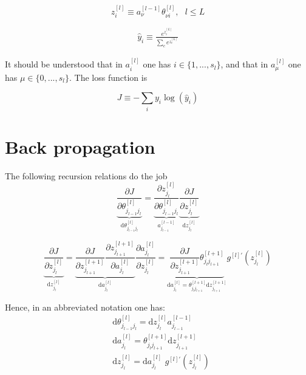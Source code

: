 \documentclass[a4paper,11pt]{article}
\newcommand{\dd}{\text{d}}
\newcommand{\na}[2]{a_{#1}^{[#2]}}
\newcommand{\nz}[2]{z_{#1}^{[#2]}}
\newcommand{\na}[3]{a_{#1 #2}^{[#2]}}
\newcommand{\nz}[3]{z_{#1 #2}^{[#2]}}
\newcommand{\nt}[3]{\theta_{#1 #2}^{[#3]}}
\newcommand{\nt}[4]{\theta_{#1 #2 #3}^{[#4]}}
\newcommand{\ff}[2]{#1 \left(#2 \right)}
\begin{document}
\begin{equation}
    \nz{i}{l}\equiv \na{\nu }{l-1} \nt{\nu}{i}{l} ,\,\,\,\, l\le L %
\end{equation}

\begin{align}
 \hat{y}_i \equiv   \frac{e^{\nz{i}{L}} } {\sum_c e^{\nz{c}{L} }}
\end{align}

It should be understood that in $\na{i}{l}$
one has  $i \in \{1,..., s_l\} $,
and that in $\na{\mu}{l}$ one has $ \mu \in \{0,..., s_l\}$. The loss function is

\begin{equation}
    J\equiv -\sum_i y_i \ff{\log}{\hat{y}_i }
\end{equation}

\section{Back propagation}

The following recursion relations do the job
\begin{equation}
    \underbrace{
    \frac{\partial J }{\partial  \nt{j_{l-1}}{j_{l}}{l}  }
    }_{\dd  \nt{j_{l-1}}{j_l}{l} }
   =
   \underbrace{
    \frac{\partial \nz{j_l}{l} }{\partial \nt{j_{l-1}}{j_l}{l}  }
    }_{ \na{j_{l-1}}{l-1} }
   \underbrace{
    \frac{\partial J  }{\partial \nz{j_l}{l} }
    }_{\dd  \nz{j_{l}}{l} }
\end{equation}



\begin{equation}
\underbrace{
\frac{\partial J  }{\partial \nz{j_l}{l}   }
}_{\dd  \nz{j_{l}}{l} }
	=
	\underbrace{
	\frac{\partial J  }{\partial \nz{j_{l+1}}{l+1}   }
	\frac{\partial \nz{j_{l+1}}{l+1}}{\partial \na{j_{l}}{l}}
	}_{\dd a_{j_l}^{[l]} }
	\frac{\partial \na{j_{l}}{l}    }{ \partial \nz{j_{l}}{l}  }
	=
	\underbrace{
	\frac{\partial J  }{\partial \nz{j_{l+1}}{l+1}   }
	 \nt{j_l}{j_{l+1}}{l+1}
	 }_{ \dd a_{j_l}^{[l]}=\theta^{[l+1]}_{j_l j_{l+1}} \dd z_{j_{l+1}}^{[l+1]} }
	 g^{[l]'}\left( z_{j_{l}}^{[l]}   \right)
\end{equation}

Hence, in an abbreviated notation one has:
\begin{eqnarray}
	&\dd  \nt{j_{l-1}}{j_l}{l} = \dd  \nz{j_{l}}{l}  \na{j_{l-1}}{l-1}\\
	&\dd a_{j_{l}}^{[l]}=\theta^{[l+1]}_{j_{l} j_{l+1}} \dd z_{j_{l+1}}^{[l+1]}\\
	&\dd  \nz{j_{l}}{l}= \dd a_{j_l}^{[l]} \,\, g^{[l]'}\left( z_{j_{l}}^{[l]}   \right)
\end{eqnarray}
\end{document}
